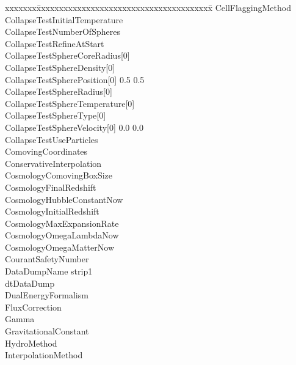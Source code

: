 \documentclass{book}
\begin{document}
{\parametersize
\begin{tabbing}
xxxxxxx\=xxxxxxxxxxxxxxxxxxxxxxxxxxxxxxxxxxxxxxx\=\kill
\> CellFlaggingMethod             \\
\> CollapseTestInitialTemperature      \\
\> CollapseTestNumberOfSpheres  \\
\> CollapseTestRefineAtStart    \\
\> CollapseTestSphereCoreRadius[0]   \\
\> CollapseTestSphereDensity[0]      \\
\> CollapseTestSpherePosition[0]     0.5 0.5 \\
\> CollapseTestSphereRadius[0]       \\
\> CollapseTestSphereTemperature[0]  \\
\> CollapseTestSphereType[0]                \\
\> CollapseTestSphereVelocity[0]     0.0 0.0 \\
\> CollapseTestUseParticles     \\
\> ComovingCoordinates                \\
\> ConservativeInterpolation    \\
\> CosmologyComovingBoxSize         \\
\> CosmologyFinalRedshift             \\
\> CosmologyHubbleConstantNow       \\
\> CosmologyInitialRedshift          \\
\> CosmologyMaxExpansionRate      \\
\> CosmologyOmegaLambdaNow     \\
\> CosmologyOmegaMatterNow     \\
\> CourantSafetyNumber          \\
\> DataDumpName           \> strip1 \\
\> dtDataDump              \\
\> DualEnergyFormalism                 \\
\> FluxCorrection               \\
\> Gamma                        \\
\> GravitationalConstant              \\
\> HydroMethod                  \\
\> InterpolationMethod                 \\

\end{tabbing}}
\end{document}
